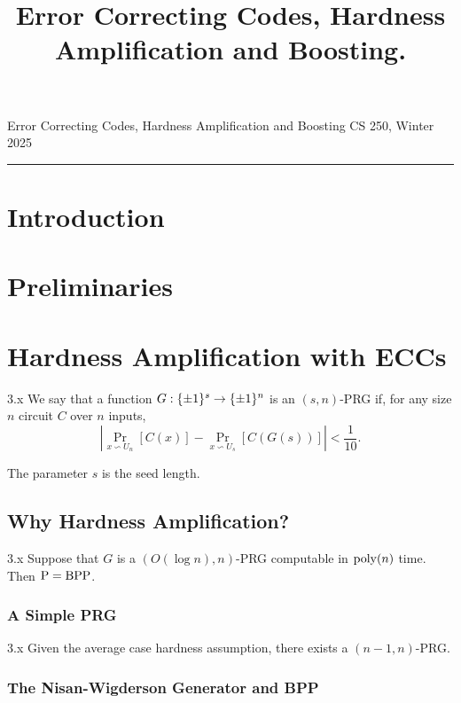 \documentclass{article}
\title{Error Correcting Codes, Hardness Amplification and Boosting.}
\date{}
\begin{document}
    
\noindent Error Correcting Codes, Hardness Amplification and Boosting \hfill  CS 250, Winter 2025\\
\hrule

\section{Introduction}

\section{Preliminaries}

\section{Hardness Amplification with ECCs}

\begin{definition}{3.x}
    We say that a function $G : \{\pm 1\}^s \rightarrow \{\pm 1\}^{n}$ is an $(s, n)$-PRG if, for any size $n$ circuit $C$ over $n$ inputs, 
    \begin{equation*}
        \left|\Pr_{x \backsim U_n}[C(x)] - \Pr_{x \backsim U_s}[C(G(s))]\right| < \frac{1}{10}.
    \end{equation*}
\end{definition}

The parameter $s$ is the seed length.

\subsection{Why Hardness Amplification?}

\begin{theorem}{3.x} Suppose that $G$ is a $(O(\log n), n)$-PRG computable in $\mathrm{poly}(n)$ time. Then $\mathrm{P} = \mathrm{BPP}$.
\end{theorem}

\subsubsection{A Simple PRG}

\begin{theorem}{3.x}
    Given the average case hardness assumption, there exists a $(n - 1, n)$-PRG.
\end{theorem}

\subsubsection{The Nisan-Wigderson Generator and BPP}
\end{document}

